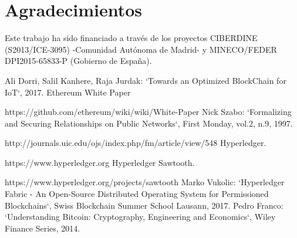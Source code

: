 \documentclass[10pt,conference,a4paper]{IEEEtran}
\begin{document}
\section*{Agradecimientos}

Este trabajo ha sido financiado a través de los proyectos
CIBERDINE (S2013/ICE-3095) -Comunidad Autónoma de Madrid- y
MINECO/FEDER DPI2015-65833-P (Gobierno de España).



\begin{thebibliography}{99}
Ali Dorri, Salil Kanhere, Raja Jurdak: `Towards an Optimized BlockChain for IoT`, 2017.
Ethereum White Paper

https://github.com/ethereum/wiki/wiki/White-Paper
Nick Szabo: `Formalizing and Securing Relationships on Public Networks`, First Monday, vol.2, n.9, 1997.

http://journals.uic.edu/ojs/index.php/fm/article/view/548
Hyperledger.

https://www.hyperledger.org
Hyperledger Sawtooth.

https://www.hyperledger.org/projects/sawtooth
Marko Vukolic: `Hyperledger Fabric - An Open-Source Distributed Operating System for Permissioned Blockchains`, Swiss Blockchain Summer School Lausann, 2017.
Pedro Franco: `Understanding Bitcoin: Cryptography, Engineering and Economics`, Wiley Finance Series, 2014.

\end{thebibliography}
\end{document}
